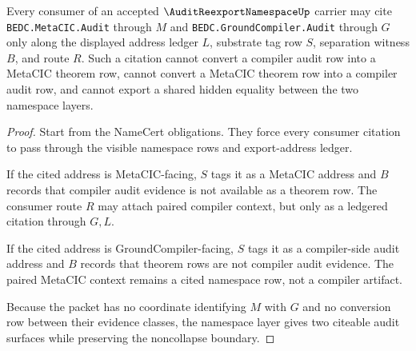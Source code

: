 \begin{theorem}
\label{thm:audit-reexport-namespace-noncollapse}
Every consumer of an accepted $\AuditReexportNamespaceUp$ carrier may cite \texttt{BEDC.MetaCIC.Audit} through $M$ and \texttt{BEDC.GroundCompiler.Audit} through $G$ only along the displayed address ledger $L$, substrate tag row $S$, separation witness $B$, and route $R$. Such a citation cannot convert a compiler audit row into a MetaCIC theorem row, cannot convert a MetaCIC theorem row into a compiler audit row, and cannot export a shared hidden equality between the two namespace layers.
\end{theorem}
\begin{proof}
Start from the NameCert obligations. They force every consumer citation to pass through the visible namespace rows and export-address ledger.

If the cited address is MetaCIC-facing, $S$ tags it as a MetaCIC address and $B$ records that compiler audit evidence is not available as a theorem row. The consumer route $R$ may attach paired compiler context, but only as a ledgered citation through $G,L$.

If the cited address is GroundCompiler-facing, $S$ tags it as a compiler-side audit address and $B$ records that theorem rows are not compiler audit evidence. The paired MetaCIC context remains a cited namespace row, not a compiler artifact.

Because the packet has no coordinate identifying $M$ with $G$ and no conversion row between their evidence classes, the namespace layer gives two citeable audit surfaces while preserving the noncollapse boundary.
\end{proof}


\begin{closurestatus}{\AuditReexportNamespaceUp}
  \theoryclosure{\seedClosure}
  \formalstatus{\unformalizedV}
\end{closurestatus}
